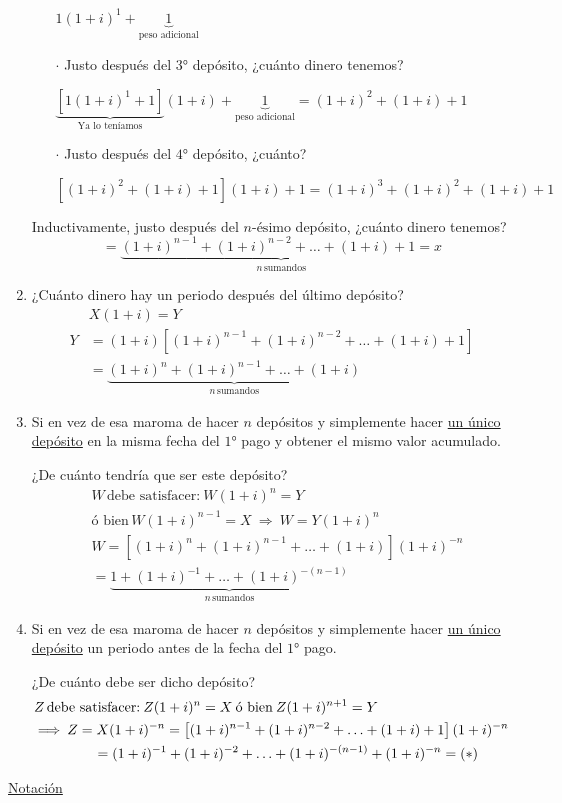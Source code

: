 \begin{enumerate}[label=\protect\circled{\arabic*}]
\begin{itemize}
$1(1+i)^1+\underbrace{1}_{\scriptstyle \text{peso adicional}}$
\item[$\cdot$] Justo después del $3\text{°}$ depósito, ¿cuánto dinero tenemos?

$\underbrace{\left[1(1+i)^1 + 1 \right]}_{\scriptstyle \text{Ya lo teníamos}}(1+i) + \underbrace{1}_{\scriptstyle \text{peso adicional}} = (1+i)^2 +(1+i) +1 $
\item[$\cdot$] Justo después del $4\text{°}$ depósito, ¿cuánto?

$\left[(1+i)^2 + (1+i) +1 \right](1+i) +1 = (1+i)^3 +(1+i)^2 + (1+i) +1 $
\end{itemize}

Inductivamente, justo después del $n\text{-ésimo}$ depósito, ¿cuánto dinero tenemos?
$$=\underbrace{(1+i)^{n-1}+(1+i)^{n-2}+\ldots+(1+i) +1 = x}_{\scriptstyle n\, \text{sumandos}}$$

\item ¿Cuánto dinero hay un periodo después del último depósito?
\begin{align*}
&X(1+i) = Y\\
Y &= (1+i)\left[(1+i)^{n-1} + (1+i)^{n-2}+ \ldots + (1+i) +1 \right] \\
&= \underbrace{(1+i)^n + (1+i)^{n-1} + \ldots + (1+i)}_{\scriptstyle n\, \text{sumandos}}
\end{align*}
\item Si en vez de esa maroma de hacer $n$ depósitos y simplemente hacer \uline{un único depósito} en la misma fecha del $1\text{°}$ pago y obtener el mismo valor acumulado.

¿De cuánto tendría que ser este depósito?
\begin{align*}
&W\,\text{debe satisfacer:} \: W(1+i)^n = Y\\
&\text{ó bien} \, W(1+i)^{n-1} = X \: \Longrightarrow \: W=Y(1+i)^n\\
& W = \left[(1+i)^n + (1+i)^{n-1}+\ldots + (1+i) \right] (1+i)^{-n}\\
&= \underbrace{1+ (1+i)^{-1} + \ldots + (1+i)^{-(n-1)}}_{\scriptstyle n\, \text{sumandos}} 
\end{align*}
\item Si en vez de esa maroma de hacer $n$ depósitos y simplemente hacer \uline{un único depósito} un periodo antes de la fecha del $1\text{°}$ pago. 

¿De cuánto debe ser dicho depósito?
\begin{align*}
&Z\,\text{debe satisfacer:}\: Z(1+i)^n=X \: \text{ó bien} \: Z(1+i)^{n+1} = Y\\
& \Longrightarrow \: Z= X(1+i)^{-n} = \left[(1+i)^{n-1} + (1+i)^{n-2} + \ldots + (1+i) + 1 \right](1+i)^{-n}\\
&\hspace{1.5cm} = (1+i)^{-1} +(1+i)^{-2} +\ldots +(1+i)^{-(n-1)} + (1+i)^{-n} = (*) 
\end{align*}
\end{enumerate}
\uline{Notación}

